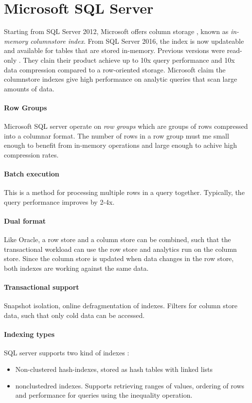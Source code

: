 \section{Microsoft SQL Server}
Starting from SQL Server 2012, Microsoft offers column storage \cite{noauthor_undated-py}, known as \textit{in-memory columnstore index}. From SQL Server 2016, the index is now updateable and available for tables that are stored in-memory. Previous versions were read-only \cite{noauthor_undated-ut}. They clain their product achieve up to 10x query performance and 10x data compression compared to a row-oriented storage. Microsoft claim the columnstore indexes give high performance on analytic queries that scan large amounts of data.

\paragraph{Row Groups}
\label{par:Row Groups}
Microsoft SQL server operate on \textit{row groups} which are groups of rows compressed into a columnar format. The number of rows in a row group must me small enough to benefit from in-memory operations and large enough to achive high compression rates.

\paragraph{Batch execution}
\label{par:Batch execution}
This is a method for processing multiple rows in a query together. Typically, the query performance improves by 2-4x. 

\paragraph{Dual format}
\label{par:Dual format}
Like Oracle, a row store and a column store can be combined, such that the transactional workload can use the row store and analytics run on the column store. Since the column store is updated when data changes in the row store, both indexes are working against the same data.

\paragraph{Transactional support}
\label{par:Transactional support}
Snapshot isolation, online defragmentation of indexes. Filters for column store data, such that only cold data can be accessed. \cite{noauthor_undated-tc}

\paragraph{Indexing types}
\label{par:Indexing types}
SQL server supports two kind of indexes \cite{Delaney2014-ip}:
\begin{itemize}
  \item Non-clustered hash-indexes, stored as hash tables with linked lists
  \item nonclustedred indexes. Supports retrieving ranges of values, ordering of rows and performance for queries using the inequality operation.
\end{itemize}

